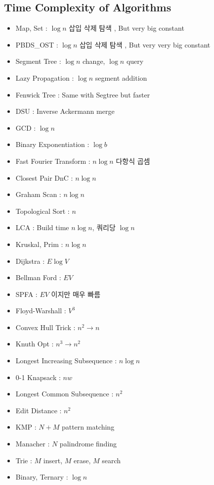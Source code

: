 \documentclass[landscape,8pt]{article}
\begin{document}
\begin{multicols}{2}
  \subsection{Time Complexity of Algorithms}
    \begin{itemize}
      \item Map, Set : $\log n$ 삽입 삭제 탐색 , But very big constant
      \item PBDS\_OST : $\log n$ 삽입 삭제 탐색 , But very very big constant
      \item Segment Tree : $\log n$ change, $\log n$ query
      \item Lazy Propagation : $\log n$ segment addition
      \item Fenwick Tree : Same with Segtree but faster
      \item DSU : Inverse Ackermann merge
      \item GCD : $\log n$
      \item Binary Exponentiation : $\log b$
      \item Fast Fourier Transform : $n\log n$ 다항식 곱셈
      \item Closest Pair DnC : $n \log n$
      \item Graham Scan : $n \log n$
      \item Topological Sort : $n$
      \item LCA : Build time $n \log n$, 쿼리당 $\log n$
      \item Kruskal, Prim : $n\log n$
      \item Dijkstra : $E \log V$
      \item Bellman Ford : $EV$
      \item SPFA : $EV$ 이지만 매우 빠름
      \item Floyd-Warshall : $V^3$
      \item Convex Hull Trick : $n^2 \to n$
      \item Knuth Opt : $n^3 \to n^2$
      \item Longest Increasing Subsequence : $n \log n$
      \item 0-1 Knapsack : $nw$
      \item Longest Common Subsequence : $n^2$
      \item Edit Distance : $n^2$
      \item KMP : $N+M$ pattern matching
      \item Manacher : $N$ palindrome finding
      \item Trie : $M$ insert, $M$ erase, $M$ search
      \item Binary, Ternary : $\log n$
    \end{itemize}


\end{multicols}
\end{document}
